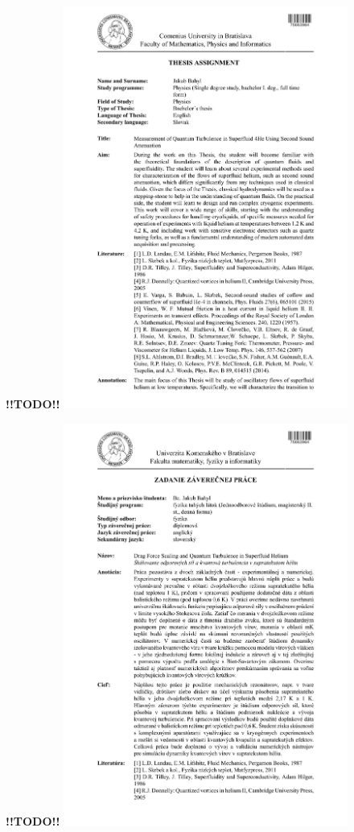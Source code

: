 \documentclass[a4paper, 12pt]{report}
\newcommand{\<}{\langle} %
\renewcommand{\>}{\rangle} %
\newcommand{\todo}[1]{ {\bf !!TODO!!}\qquad{#1} } %
\begin{document}
\pagestyle{empty}




\todo{}
\includegraphics[width=0.7\textwidth]{docs/zadanie_Bahyl_EN.pdf}

\newpage

\todo{}
\includegraphics[width=0.7\textwidth]{docs/zadanie_Bahyl_SVK.pdf}
\end{document}
